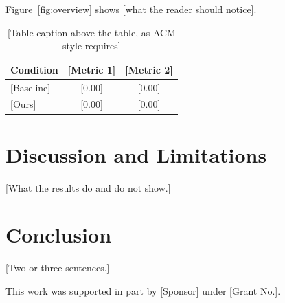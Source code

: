 \documentclass[sigconf,review,anonymous]{acmart}
\begin{document}
Figure~\ref{fig:overview} shows [what the reader should notice].

\begin{table}[t]
  \caption{[Table caption above the table, as ACM style requires]}
  \label{tab:results}
  \begin{tabular}{lcc}
    \toprule
    Condition & [Metric 1] & [Metric 2] \\
    \midrule
    {[Baseline]} & {[0.00]} & {[0.00]} \\
    {[Ours]}     & {[0.00]} & {[0.00]} \\
    \bottomrule
  \end{tabular}
\end{table}

\section{Discussion and Limitations}
[What the results do and do not show.]

\section{Conclusion}
[Two or three sentences.]

\begin{acks}
This work was supported in part by [Sponsor] under [Grant No.].
\end{acks}



\end{document}
